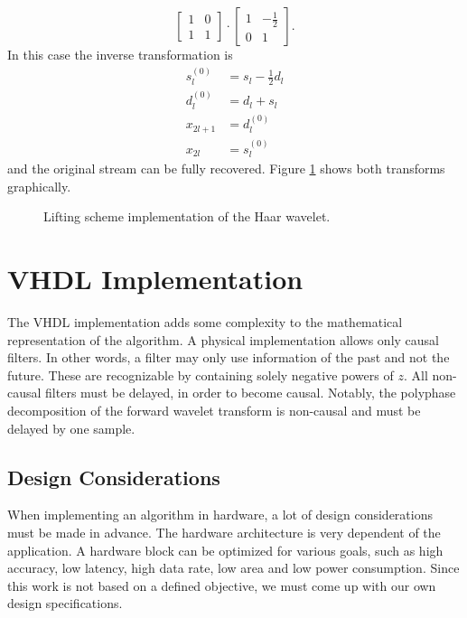 \begin{refsection}
\begin{equation*}
\begin{bmatrix}
		1 & 0 \\
		1 & 1
	\end{bmatrix}
	\cdot
	\begin{bmatrix}
		1 & -\frac{1}{2} \\
		0 & 1
	\end{bmatrix}
	.
\end{equation*}
In this case the inverse transformation is 
\begin{align}\label{fpga:equation:inv_haar}
	s_l^{(0)} &= s_l - \frac{1}{2}d_l \\
	d_l^{(0)} &= d_l + s_l \\ 
	x_{2l+1}& =d_l^{(0)} \\
	x_{2l} &= s_l^{(0)}
\end{align}
and the original stream can be fully recovered.
Figure \ref{fpga:fig:liftingStepHaar} shows both transforms graphically.
\begin{figure}
	\centering
	
	\caption{Lifting scheme implementation of the Haar wavelet.}
	\label{fpga:fig:liftingStepHaar}
\end{figure}

\section{VHDL Implementation}

The VHDL implementation adds some complexity to the mathematical representation of the algorithm.
A physical implementation allows only causal filters.
%
In other words, a filter may only use information of the past and not the future.
These are recognizable by containing solely negative powers of $z$.
All non-causal filters must be delayed, in order to become causal.
Notably, the polyphase decomposition of the forward wavelet transform is non-causal and must be delayed by one sample.

\subsection{Design Considerations}

When implementing an algorithm in hardware, a lot of design considerations must be made in advance.
The hardware architecture is very dependent of the application.
A hardware block can be optimized for various goals, such as high accuracy, low latency, high data rate, low area and low power consumption.
Since this work is not based on a defined objective, we must come up with our own design specifications.


\end{refsection}
